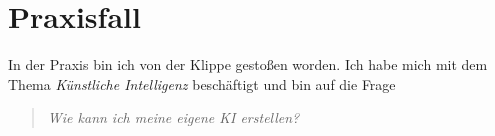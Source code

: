 \cleardoublepage
\section{Praxisfall}
\label{sec:Praxisfall}

In der Praxis bin ich von der Klippe gestoßen worden. Ich habe mich mit dem Thema \textit{Künstliche Intelligenz} beschäftigt und bin auf die Frage
\begin{quote}
    \textit{Wie kann ich meine eigene KI erstellen?}
\end{quote}
